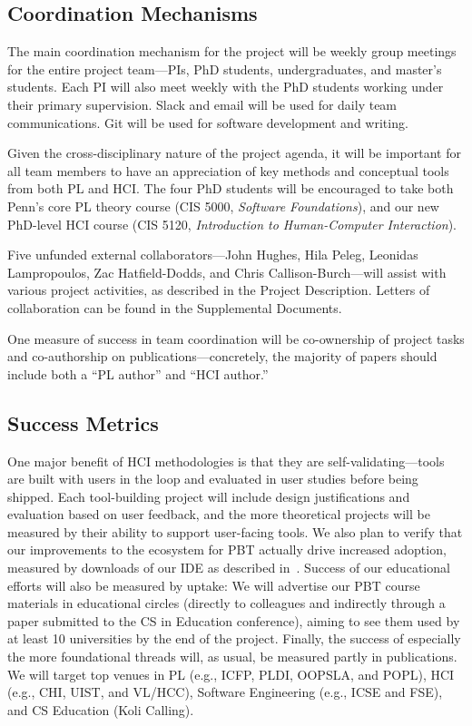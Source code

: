 \subsection*{Coordination Mechanisms}

The main coordination mechanism for the project will be weekly group
meetings for the entire project team---PIs, PhD students, undergraduates, and master's students.
%
Each PI will also meet weekly with the PhD students working under
their primary supervision.
%
Slack and email will be used for daily team communications.  Git will
be used for software development and writing.

Given the cross-disciplinary nature of the project agenda, it will be
important for all team members to have an appreciation of key methods
and conceptual tools from both PL and HCI.  The four PhD students will
be encouraged to take both Penn's core PL theory course (CIS 5000,
{\em Software Foundations}), and our new PhD-level HCI course (CIS
5120, {\em Introduction to Human-Computer Interaction}).

Five unfunded external collaborators---John Hughes, Hila Peleg,
Leonidas Lampropoulos, Zac Hatfield-Dodds, and Chris
Callison-Burch---will assist with various project activities, as
described in the Project Description.  Letters of collaboration can be
found in the Supplemental Documents.

One measure of success in team coordination will be co-ownership of
project tasks and co-authorship on publications---concretely, the
majority of papers should include both a ``PL author'' and
``HCI author.''

\subsection*{Success Metrics}

One major benefit of
HCI methodologies is that they are self-validating---tools are built with users
in the loop and evaluated in user studies before being shipped.
Each tool-building project will include design justifications and
evaluation based on user feedback, and the more theoretical
projects will be measured by their ability to support user-facing tools.
%
We also plan to verify that our improvements to the ecosystem for PBT
actually drive increased adoption, measured by
downloads of our \tyche{} IDE as described in~.
%
Success of our educational efforts will also be measured by uptake: We
will advertise our PBT course materials in educational circles
(directly to colleagues and indirectly through a paper
submitted to the CS in Education conference), aiming to see them used
by at least 10 universities by the end of the project.
%
Finally, the
success of especially the more foundational threads will, as usual, be measured
partly in publications.  We will target top venues in PL (e.g., ICFP, PLDI,
OOPSLA, and POPL), HCI (e.g., CHI, UIST, and VL/HCC), Software Engineering
(e.g., ICSE and FSE), and CS Education (Koli Calling).

\clearpage
